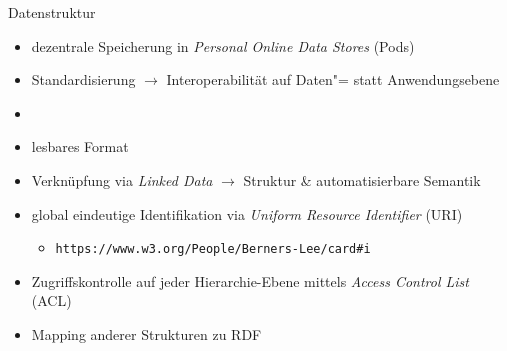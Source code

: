 \begin{frame}{Datenstruktur}
    \begin{itemize}
        \item dezentrale Speicherung in \emph{Personal Online Data Stores} (Pods)~\cite{mecklerWebLinkedData2023,sambraSolidPlatformDecentralized2016}
        \item Standardisierung $\to$ Interoperabilität auf Daten"= statt Anwendungsebene
        
        \item {}
        
        \pause
        \pause
        \item lesbares Format 
        
        \pause
        \pause
        \item Verknüpfung via \emph{Linked Data} $\to$ Struktur \& automatisierbare Semantik~\cite{bizerLinkedDataStory2009,mecklerWebLinkedData2023}

        \pause
        \item global eindeutige Identifikation via \emph{Uniform Resource Identifier} (URI)~\cite{sambraSolidPlatformDecentralized2016}
        \begin{itemize}
            \item \texttt{https://www.w3.org/People/Berners-Lee/card\#i}~\cite{bizerLinkedDataStory2009}
        \end{itemize}
        
        \pause
        \item Zugriffskontrolle auf jeder Hierarchie-Ebene mittels \emph{Access Control List} (ACL)
        
        \pause
        \item Mapping anderer Strukturen zu RDF~\cite{mecklerWebLinkedData2023,sambraSolidPlatformDecentralized2016}
    \end{itemize}
\end{frame}


